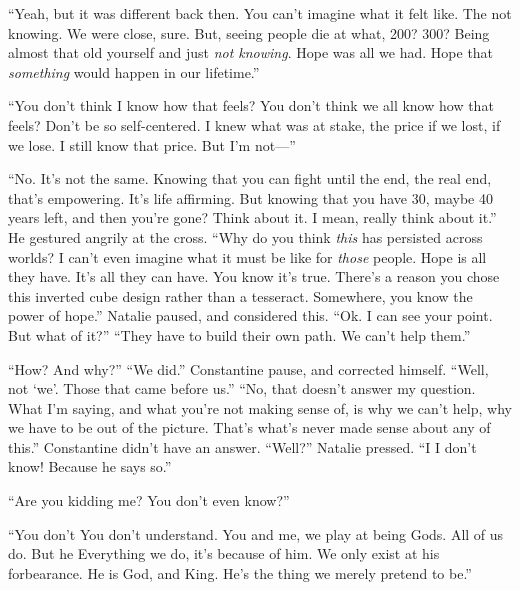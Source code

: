 “Yeah, but it was different back then. You can’t imagine what it felt like. The not knowing. We were close, sure. But, seeing people die at what, 200? 300? Being almost that old yourself and just \emph{not knowing}. Hope was all we had. Hope that \emph{something} would happen in our lifetime.”

“You don’t think I know how that feels? You don’t think we all know how that feels? Don’t be so self-centered. I knew what was at stake, the price if we lost, if we lose. I still know that price. But I’m not\mbox{---}”

“No. It’s not the same. Knowing that you can fight until the end, the real end, that’s empowering. It’s life affirming. But knowing that you have 30, maybe 40 years left, and then you’re gone? Think about it. I mean, really think about it.” He gestured angrily at the cross. “Why do you think \emph{this} has persisted across worlds? I can’t even imagine what it must be like for \emph{those} people. Hope is all they have. It’s all they can have. You know it’s true. There’s a reason you chose this inverted cube design rather than a tesseract. Somewhere, you know the power of hope.”
\SomeVSpace
Natalie paused, and considered this. “Ok. I can see your point. But what of it?”
\SomeVSpace
“They have to build their own path. We can’t help them.”

“How? And why?”
\SmallVSpace
“We did.” Constantine pause, and corrected himself. “Well, not ‘we’. Those that came before us.”
\SmallVSpace
“No, that doesn’t answer my question. What I’m saying, and what you’re not making sense of, is why we can’t help, why we have to be out of the picture. That’s what’s never made sense about any of this.”
\SmallVSpace
Constantine didn’t have an answer. “Well?” Natalie pressed.
\SmallVSpace
“I{\el} I don’t know! Because he says so.”

“Are you kidding me? You don’t even know?”

“You don’t{\el} You don’t understand. You and me, we play at being Gods. All of us do. But he{\el} Everything we do, it’s because of him. We only exist at his forbearance. He is God, and King. He’s the thing we merely pretend to be.”

